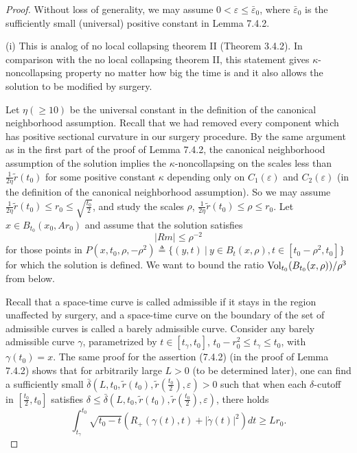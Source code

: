\begin{proof}
Without loss of generality, we may assume $0<\varepsilon \leq
\bar{\varepsilon}_0$, where $\bar{\varepsilon}_0$ is the
sufficiently small (universal) positive constant in Lemma 7.4.2.

\medskip
(i) This is analog of no local collapsing theorem II (Theorem
3.4.2). In comparison with the no local collapsing theorem II,
this statement gives $\kappa$-noncollapsing property no matter how
big the time is and it also allows the solution to be modified by
surgery.

Let $\eta (\geq 10)$ be the universal constant in the definition
of the canonical neighborhood assumption. Recall that we had
removed every component which has positive sectional curvature in
our surgery procedure. By the same argument as in the first part
of the proof of Lemma 7.4.2, the canonical neighborhood assumption
of the solution implies the $\kappa$-noncollapsing on the scales
less than $\frac{1}{2\eta}\widetilde{r}(t_0)$ for some positive
constant $\kappa$ depending only on $C_1(\varepsilon)$ and
$C_2(\varepsilon)$ (in the definition of the canonical
neighborhood assumption). So we may assume
$\frac{1}{2\eta}\widetilde{r}(t_0)\leq r_0\leq
\sqrt{\frac{t_0}{2}}$, and study the scales $\rho$,
$\frac{1}{2\eta}\widetilde{r}(t_0)\leq \rho\leq r_0$. Let $x\in
B_{t_0}(x_0,Ar_0)$ and assume that the solution satisfies
$$
|Rm|\leq \rho^{-2}
$$
for those points in $P(x,t_0,\rho,-\rho^{2})\triangleq\{(y,t)\ |\
y\in B_t(x,\rho),t\in[t_0-\rho^2,t_0]\}$ for which the solution is
defined. We want to bound the ratio
$\operatorname{Vol}_{t_0}(B_{t_0}(x,\rho))/\rho^3$ from below.

Recall that a space-time curve is called admissible if it stays in
the region unaffected by surgery, and a space-time curve on the
boundary of the set of admissible curves is called a barely
admissible curve. Consider any barely admissible curve $\gamma$,
parametrized by $t\in[t_{\gamma},t_0]$, $t_0-r^2_0\leq
t_{\gamma}\leq t_0$, with $\gamma(t_0)=x$. The same proof for the
assertion (7.4.2) (in the proof of Lemma 7.4.2) shows that for
arbitrarily large $L>0$ (to be determined later), one can find a
sufficiently small
$\bar{\delta}(L,t_0,\widetilde{r}(t_0),\widetilde{r}
(\frac{t_0}{2}),\varepsilon)>0$ such that when each
$\delta$-cutoff in $[\frac{t_0}{2},t_0]$ satisfies $\delta \leq
\bar{\delta}(L,t_0,\widetilde{r}(t_0),\widetilde{r}
(\frac{t_0}{2}),\varepsilon)$, there holds \begin{equation}
\int^{t_0}_{t_{\gamma}}\sqrt{t_0-t}(R_+(\gamma(t),t)
+|\dot{\gamma}(t)|^2)dt\geq Lr_0. %
\end{equation}


\end{proof}
